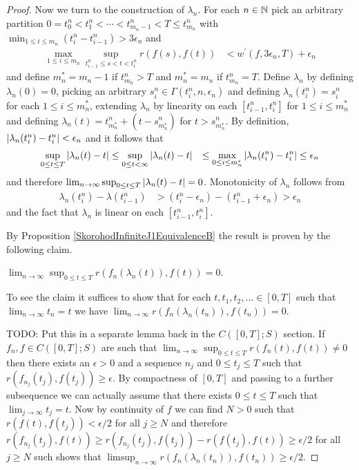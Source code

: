 \begin{proof}
Now we turn to the construction of $\lambda_n$.  For each $n \in \mathbb{N}$ pick an arbitrary partition $0 = t^n_0 < t^n_1 < \dotsb < t^n_{m_n -1} < T \leq t^n_{m_n}$ with
$\min_{1 \leq i \leq m_n} (t^n_i - t^n_{i-1}) > 3\epsilon_n$ and 
\begin{align*}
\max_{1 \leq i \leq m_n} \sup_{t^n_{i-1} \leq s < t < t^n_i} r(f(s), f(t)) &< w^\prime(f, 3\epsilon_n, T) + \epsilon_n
\end{align*}
and define $m^*_n = m_n -1$ if $t^n_{m_n} > T$ and $m^*_n = m_n$ if $t^n_{m_n} = T$.  Define $\lambda_n$ by defining $\lambda_n(0) = 0$, picking an arbitrary $s^n_i \in \Gamma(t^n_i, n, \epsilon_n)$ and defining $\lambda_n(t^n_i) = s^n_i$ for each
$1 \leq i \leq m^*_n$, extending $\lambda_n$ by linearity on each $[t^n_{i-1}, t^n_i]$ for $1 \leq i \leq m^*_n$ and defining $\lambda_n(t) = t^n_{m^*_n} + (t - s^n_{m^*_n})$ for $t > s^n_{m^*_n}$.  By definition, $\left \vert \lambda_n(t^n_i) - t^n_i \right \vert < \epsilon_n$ and it follows that 
\begin{align*}
\sup_{0 \leq t \leq T} \left \vert \lambda_n(t) - t \right \vert &\leq \sup_{0 \leq t < \infty} \left \vert \lambda_n(t) - t \right \vert &\leq \max_{0 \leq i \leq m^*_n} \left \vert \lambda_n(t^n_i) - t^n_i \right \vert \leq \epsilon_n
\end{align*}
and therefore $\lim_{n \to \infty} \sup_{0 \leq t \leq T} \left \vert \lambda_n(t) - t \right \vert = 0$.  Monotonicity of $\lambda_n$ follows from 
\begin{align*}
\lambda_n(t^n_{i}) - \lambda(t^n_{i-1}) &> (t^n_i - \epsilon_n) - (t^n_{i-1} + \epsilon_n) > \epsilon_n
\end{align*}
and the fact that $\lambda_n$ is linear on each $[t^n_{i-1}, t^n_i]$.

By Proposition \ref{SkorohodInfiniteJ1EquivalenceB} the result is proven by the following claim.
\begin{clm} $\lim_{n \to\infty} \sup_{0 \leq t \leq T} r(f_n(\lambda_n(t)), f(t)) = 0$.
\end{clm}
To see the claim it suffices to show that for each $t, t_1, t_2, \dots \in [0,T]$ such that $\lim_{n \to \infty} t_n = t$ we have $\lim_{n \to \infty} r(f_n(\lambda_n(t_n)), f(t_n)) = 0$.

TODO: Put this in a separate lemma back in the $C([0,T];S)$ section.  If $f_n,f \in C([0,T];S)$ are such that $\lim_{n \to \infty} \sup_{0 \leq t \leq T} r(f_n(t), f(t)) \neq 0$ then there exists an $\epsilon > 0$ and a sequence $n_j$ and $0 \leq t_j \leq T$ such that $r(f_{n_j}(t_j), f(t_j)) \geq \epsilon$.  By compactness of $[0,T]$ and passing to a further subsequence we can actually assume that there exists $0 \leq t \leq T$ such that $\lim_{j \to \infty} t_j = t$.  Now by continuity of $f$ we can find $N > 0$ such that $r(f(t), f(t_j)) < \epsilon/2$ for all
$j \geq N$ and therefore $r(f_{n_j}(t_j), f(t)) \geq r(f_{n_j}(t_j), f(t_j)) - r(f(t_j), f(t)) \geq \epsilon/2$ for all $j \geq N$ such shows that $\limsup_{n \to \infty} r(f_n(\lambda_n(t_n)), f(t_n)) \geq \epsilon/2$.


\end{proof}
